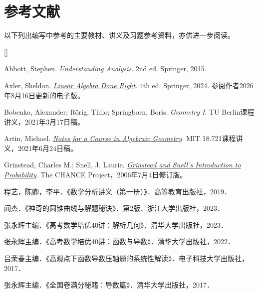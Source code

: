 \chapter*{参考文献}

以下列出编写中参考的主要教材、讲义及习题参考资料，亦供进一步阅读。

\begin{list}{[]}{%
  \setlength{\leftmargin}{2.4em}%
  \setlength{\labelwidth}{2em}%
  \setlength{\labelsep}{.4em}%
  \setlength{\itemsep}{6pt}%
  \setlength{\parsep}{0pt}%
  \setlength{\topsep}{6pt}}

\item Abbott, Stephen.
\href{https://doi.org/10.1007/978-1-4939-2712-8}{\emph{Understanding Analysis}}.
2nd ed. Springer, 2015.

\item Axler, Sheldon.
\href{https://linear.axler.net/LADR4e.pdf}{\emph{Linear Algebra Done Right}}.
4th ed. Springer, 2024. 参阅作者2026年8月16日更新的电子版。

\item Bobenko, Alexander; R\"orig, Thilo; Springborn, Boris.
\emph{Geometry I}. TU Berlin课程讲义，2021年3月17日稿。

\item Artin, Michael.
\href{https://math.mit.edu/classes/18.721/ag-jun24-2021.pdf}{\emph{Notes for a Course in Algebraic Geometry}}.
MIT 18.721课程讲义，2021年6月24日稿。

\item Grinstead, Charles M.; Snell, J. Laurie.
\href{https://math.dartmouth.edu/~prob/prob/prob.pdf}{\emph{Grinstead and Snell's Introduction to Probability}}.
The CHANCE Project，2006年7月4日修订版。

\item 程艺，陈卿，李平．《数学分析讲义（第一册）》．高等教育出版社，2019．

\item 闻杰．《神奇的圆锥曲线与解题秘诀》．第2版．浙江大学出版社，2023．

\item 张永辉主编．《高考数学培优40讲：解析几何》．清华大学出版社，2023．

\item 张永辉主编．《高考数学培优40讲：函数与导数》．清华大学出版社，2022．

\item 吕荣春主编．《高观点下函数导数压轴题的系统性解读》．电子科技大学出版社，2017．

\item 张永辉主编．《全国卷满分秘籍：导数篇》．清华大学出版社，2017．

\end{list}
